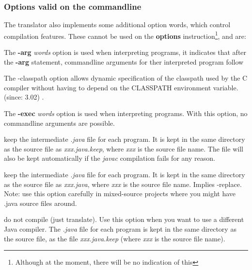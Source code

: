 \subsubsection{Options valid on the commandline}
The translator also implements some additional option words, which
control compilation features.  These cannot be used on the
\textbf{options} instruction\footnote{Although at the moment, there will be no indication of this}, and are:
\begin{description}
\item[arg]
The \textbf{-arg} \emph{words} option is used when interpreting
programs, it indicates that after the \textbf{-arg} statement,
commandline arguments for ther interpreted program follow

\item[classpath]
The -classpath option allows dynamic specification of the classpath
used by the \nr{}C compiler without having to depend on the
CLASSPATH environment variable. (since: \nr{} 3.02)
.
\item[exec]
The \textbf{-exec} \emph{words} option is used when interpreting programs. With this option, no commandline arguments are possible.
\item[keep]
keep the intermediate \emph{.java} file for each program.  It is kept in
the same directory as the \nr{} source file as \emph{xxx.java.keep},
where \emph{xxx} is the source file name.  The file will also be kept
automatically if the \emph{javac} compilation fails for any reason.
\item[keepasjava]
keep the intermediate \emph{.java} file for each program.  It is kept in
the same directory as the \nr{} source file as \emph{xxx.java},
where \emph{xxx} is the source file name.  Implies -replace. Note: use this option carefully in mixed-source projects where you might have .java source files around.
\item[nocompile]
do not compile (just translate).  Use this option when you want to use a
different Java compiler.  The \emph{.java} file for each program is kept
in the same directory as the \nr{} source file, as the
file \emph{xxx.java.keep} (where \emph{xxx} is the source file name).

\end{description}
